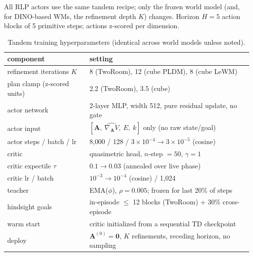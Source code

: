 \documentclass{article} %
\theoremstyle{plain}
\theoremstyle{definition}
\begin{document}
All RLP actors use the same tandem recipe; only the frozen world model (and,
for DINO-based WMs, the refinement depth $K$) changes. Horizon $H=5$ action
blocks of 5 primitive steps; actions z-scored per dimension.

\begin{table}[H]
\caption{Tandem training hyperparameters (identical across world models unless
noted).}
\label{tab:hypers}
\begin{center}
\small
\begin{tabular}{ll}
\toprule
component & setting\\
\midrule
refinement iterations $K$ & 8 (TwoRoom), 12 (cube PLDM), 8 (cube LeWM)\\
plan clamp (z-scored units) & 2.2 (TwoRoom), 3.5 (cube)\\
actor network & 2-layer MLP, width 512, pure residual update, no gate\\
actor input & $[\mathbf A,\ \widehat{\nabla_{\!\mathbf A}V},\ E,\ k]$ only (no raw state/goal)\\
actor steps / batch / lr & 8{,}000 / 128 / $3{\times}10^{-4}\!\to\!3{\times}10^{-5}$ (cosine)\\
critic & quasimetric head, $n$-step $=50$, $\gamma=1$\\
critic expectile $\tau$ & $0.1\to0.03$ (annealed over live phase)\\
critic lr / batch & $10^{-3}\!\to\!10^{-4}$ (cosine) / 1{,}024\\
teacher & EMA($\phi$), $\rho=0.005$; frozen for last 20\% of steps\\
hindsight goals & in-episode $\le$ 12 blocks (TwoRoom) + 30\% cross-episode\\
warm start & critic initialized from a sequential TD checkpoint\\
deploy & $\mathbf A^{(0)}{=}\mathbf 0$, $K$ refinements, receding horizon, no sampling\\
\bottomrule
\end{tabular}
\end{center}
\end{table}
\end{document}
